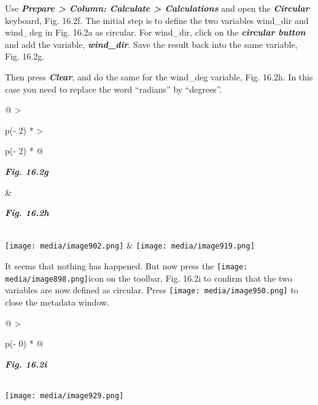 \documentclass[
  letterpaper,
  DIV=11,
  numbers=noendperiod]{scrreprt}
\begin{document}
Use \textbf{\emph{Prepare \textgreater{} Column: Calculate
\textgreater{} Calculations}} and open the \textbf{\emph{Circular}}
keyboard, Fig. 16.2f. The initial step is to define the two variables
wind\_dir and wind\_deg in Fig. 16.2a as circular. For wind\_dir, click
on the \textbf{\emph{circular button}} and add the variable,
\textbf{\emph{wind\_dir}}. Save the result back into the same variable,
Fig. 16.2g.

Then press \textbf{\emph{Clear}}, and do the same for the wind\_deg
variable, Fig. 16.2h. In this case you need to replace the word
``radians'' by ``degrees''.

\begin{longtable}[]{@{}
  >{\raggedright\arraybackslash}p{(\columnwidth - 2\tabcolsep) * }
  >{\raggedright\arraybackslash}p{(\columnwidth - 2\tabcolsep) * }@{}}
\toprule\noalign{}
\begin{minipage}[b]{\linewidth}\raggedright
\textbf{\emph{Fig. 16.2g}}
\end{minipage} & \begin{minipage}[b]{\linewidth}\raggedright
\textbf{\emph{Fig. 16.2h}}
\end{minipage} \\
\midrule\noalign{}
\endhead
\bottomrule\noalign{}
\endlastfoot
\texttt{[image: media/image902.png]} &
\texttt{[image: media/image919.png]} \\
\end{longtable}

It seems that nothing has happened. But now press the
\texttt{[image: media/image898.png]}icon
on the toolbar, Fig. 16.2i to confirm that the two variables are now
defined as circular. Press
\texttt{[image: media/image950.png]}
to close the metadata window.

\begin{longtable}[]{@{}
  >{\raggedright\arraybackslash}p{(\columnwidth - 0\tabcolsep) * }@{}}
\toprule\noalign{}
\begin{minipage}[b]{\linewidth}\raggedright
\textbf{\emph{Fig. 16.2i}}
\end{minipage} \\
\midrule\noalign{}
\endhead
\bottomrule\noalign{}
\endlastfoot
\texttt{[image: media/image929.png]} \\
\end{longtable}
\end{document}
